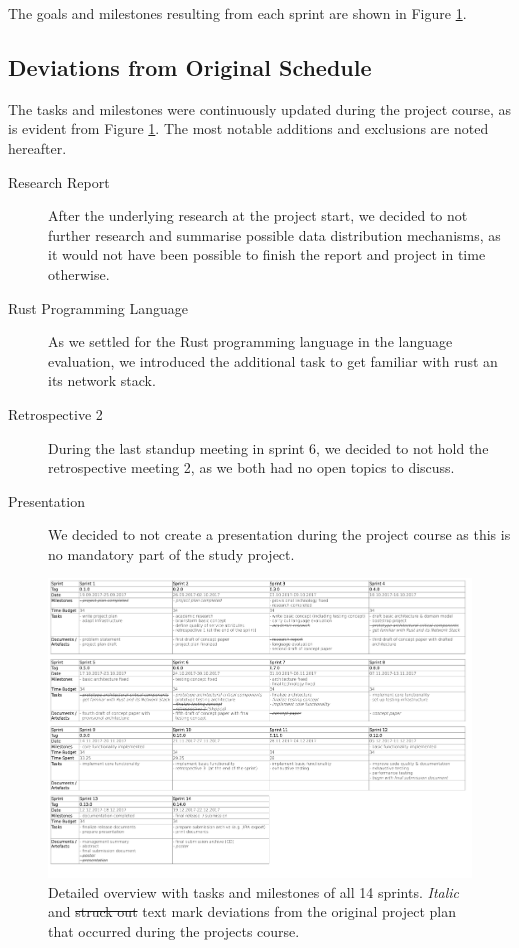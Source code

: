 The goals and milestones resulting from each sprint are shown in Figure \ref{fig:sprint-details}.

\subsection{Deviations from Original Schedule}

The tasks and milestones were continuously updated during the project course, as is evident from Figure \ref{fig:sprint-details}. The most notable additions and exclusions are noted hereafter.

\begin{description}
    \item[Research Report] After the underlying research at the project start, we decided to not further research and summarise possible data distribution mechanisms, as it would not have been possible to finish the report and project in time otherwise.
    \item[Rust Programming Language] As we settled for the Rust programming language in the language evaluation, we introduced the additional task to get familiar with rust an its network stack.
    \item[Retrospective 2] During the last standup meeting in sprint 6, we decided to not hold the retrospective meeting 2, as we both had no open topics to discuss.
    \item[Presentation] We decided to not create a presentation during the project course as this is no mandatory part of the study project.
\end{description}

\begin{figure}[h]
	\begin{sideways}
	\includegraphics[scale=0.75]{resources/sprint_details_updated}
	\end{sideways}
	\centering
	\caption{Detailed overview with tasks and milestones of all 14 sprints. \textit{Italic} and \sout{struck out} text mark deviations from the original project plan that occurred during the projects course.}
	\label{fig:sprint-details}
\end{figure}


